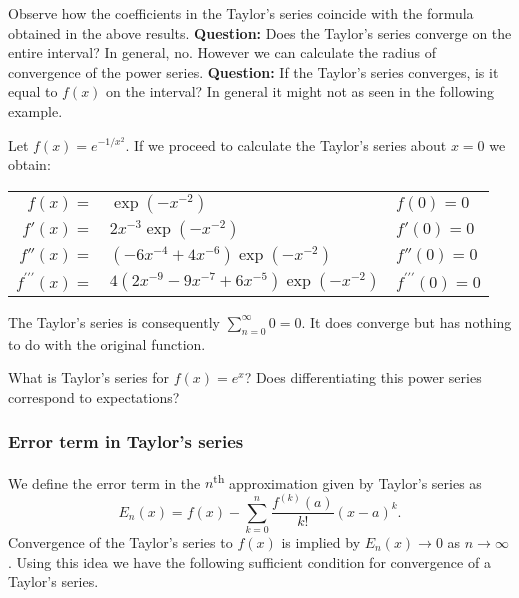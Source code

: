 Observe how the coefficients in the Taylor's series coincide with the formula obtained in the above results.
\textbf{Question:}
Does the Taylor's series converge on the entire interval?
In general, no. However we can calculate the radius of convergence of the power series.
\textbf{Question:}
If the Taylor's series converges, is it equal to \(f(x)\) on the interval?
{In general it might not as seen in the following example.}

\begin{example*}
  Let  \(f(x) = e^{-1/x^2}\).
  If we proceed to calculate the Taylor's series about \(x=0\) we obtain:

  \begin{tabular}{ r l  l}
    \(f(x) = \)
     & \hspace{-0.7em}\( \exp(-x^{-2})\)
     & \(f(0)=0\)                                                         \\
    \(f'(x)=\)
     & \hspace{-0.7em}\( 2x^{-3} \exp(-x^{-2})\)
     & \(f'(0)=0\)                                                        \\
    \(f''(x)=\)
     & \hspace{-0.7em}\( (-6 x^{-4}   + 4x^{-6} )\exp(-x^{-2})  \)
     & \(f''(0)=0\)                                                       \\
    \(f^{\prime\prime\prime}(x)=\)
     & \hspace{-0.7em}\( 4 (2x^{-9} - 9 x^{-7} + 6 x^{-5})\exp(-x^{-2})\)
     & \(f^{\prime\prime\prime}(0)=0\)
  \end{tabular}

  \noindent
  The Taylor's series is consequently \(\sum_{n=0}^{\infty} 0 = 0\).
  It does converge but has nothing to do with the original function.
\end{example*}

\begin{example*}
  What is Taylor's series for \(f(x) = e^{x}\)?
  Does differentiating this power series correspond to expectations?
\end{example*}



\subsubsection*{Error term in Taylor's series}

We define the error term in the \(n\)\textsuperscript{th} approximation given by Taylor's series as
\[
  E_n(x) = f(x) - \sum_{k=0}^{n} \frac{f^{(k)}(a)}{k!}{(x-a)}^k.
\]
Convergence of the Taylor's series to \(f(x)\) is implied by \(E_n(x) \to 0\) as \(n\to \infty\).
Using this idea we have the following sufficient condition for convergence of a Taylor's series.

